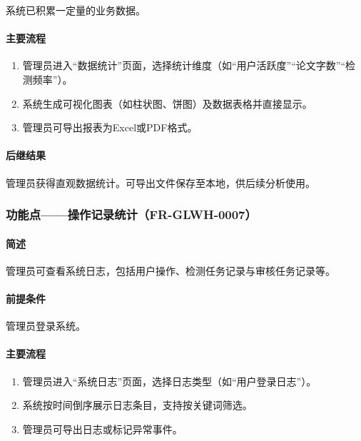 {系统已积累一定量的业务数据。

\paragraph*{主要流程}

\begin{enumerate}
    \item 管理员进入“数据统计”页面，选择统计维度（如“用户活跃度”“论文字数”“检测频率”）。
    \item 系统生成可视化图表（如柱状图、饼图）及数据表格并直接显示。
    \item 管理员可导出报表为Excel或PDF格式。
\end{enumerate}

\paragraph*{后继结果}

管理员获得直观数据统计。可导出文件保存至本地，供后续分析使用。

\subsubsection{功能点——操作记录统计（FR-GLWH-0007）}

\paragraph*{简述}

管理员可查看系统日志，包括用户操作、检测任务记录与审核任务记录等。

\paragraph*{前提条件}

管理员登录系统。

\paragraph*{主要流程}

\begin{enumerate}
    \item 管理员进入“系统日志”页面，选择日志类型（如“用户登录日志”）。
    \item 系统按时间倒序展示日志条目，支持按关键词筛选。
    \item 管理员可导出日志或标记异常事件。
\end{enumerate}

}
